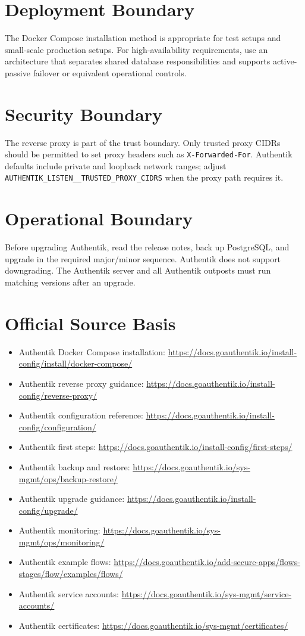 \documentclass[11pt]{article}
\newcommand{\sourcebasis}{\section*{Official Source Basis}\begin{itemize}
\item Authentik Docker Compose installation: \url{https://docs.goauthentik.io/install-config/install/docker-compose/}
\item Authentik reverse proxy guidance: \url{https://docs.goauthentik.io/install-config/reverse-proxy/}
\item Authentik configuration reference: \url{https://docs.goauthentik.io/install-config/configuration/}
\item Authentik first steps: \url{https://docs.goauthentik.io/install-config/first-steps/}
\item Authentik backup and restore: \url{https://docs.goauthentik.io/sys-mgmt/ops/backup-restore/}
\item Authentik upgrade guidance: \url{https://docs.goauthentik.io/install-config/upgrade/}
\item Authentik monitoring: \url{https://docs.goauthentik.io/sys-mgmt/ops/monitoring/}
\item Authentik example flows: \url{https://docs.goauthentik.io/add-secure-apps/flows-stages/flow/examples/flows/}
\item Authentik service accounts: \url{https://docs.goauthentik.io/sys-mgmt/service-accounts/}
\item Authentik certificates: \url{https://docs.goauthentik.io/sys-mgmt/certificates/}
\end{itemize}}
\begin{document}
\section*{Deployment Boundary}
The Docker Compose installation method is appropriate for test setups and small-scale production setups. For high-availability requirements, use an architecture that separates shared database responsibilities and supports active-passive failover or equivalent operational controls.

\section*{Security Boundary}
The reverse proxy is part of the trust boundary. Only trusted proxy CIDRs should be permitted to set proxy headers such as \texttt{X-Forwarded-For}. Authentik defaults include private and loopback network ranges; adjust \texttt{AUTHENTIK\_LISTEN\_\_TRUSTED\_PROXY\_CIDRS} when the proxy path requires it.

\section*{Operational Boundary}
Before upgrading Authentik, read the release notes, back up PostgreSQL, and upgrade in the required major/minor sequence. Authentik does not support downgrading. The Authentik server and all Authentik outposts must run matching versions after an upgrade.

\sourcebasis
\end{document}
